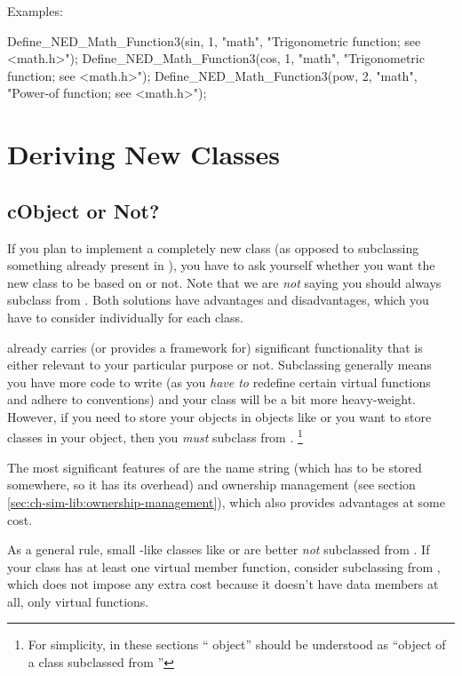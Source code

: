 Examples:

\begin{cpp}
Define_NED_Math_Function3(sin, 1, "math", "Trigonometric function; see <math.h>");
Define_NED_Math_Function3(cos, 1, "math", "Trigonometric function; see <math.h>");
Define_NED_Math_Function3(pow, 2, "math", "Power-of function; see <math.h>");
\end{cpp}



\section{Deriving New Classes}
\label{sec:ch-sim-lib:deriving-new-classes}

\subsection{cObject or Not?}

If you plan to implement a completely new class (as opposed to
subclassing something already present in {\opp}), you have
to ask yourself whether you want the new class to be based
on  or not.
Note that we are \textit{not} saying you should always
subclass from .
Both solutions have advantages and disadvantages, which you
have to consider individually for each class.

 already carries (or provides a framework for)
significant functionality that is either relevant to
your particular purpose or not. Subclassing 
generally means you have more code to write (as you \textit{have to}
redefine certain virtual functions and adhere to conventions)
and your class will be a bit more heavy-weight.
However, if you need to store your objects in {\opp} objects like 
or you want to store {\opp} classes in your object,
then you \textit{must} subclass from .
  \footnote{For simplicity, in these sections ``{\opp} object''
  should be understood as ``object of a class subclassed from
  ''}

The most significant features of  are
the name string (which has to be stored somewhere, so it has
its overhead) and ownership management (see section
\ref{sec:ch-sim-lib:ownership-management}), which
also provides advantages at some cost.

As a general rule, small -like classes like  or
 are better \textit{not} subclassed from .
If your class has at least one virtual member function, consider
subclassing from , which does not impose any
extra cost because it doesn't have data members at all, only
virtual functions.


